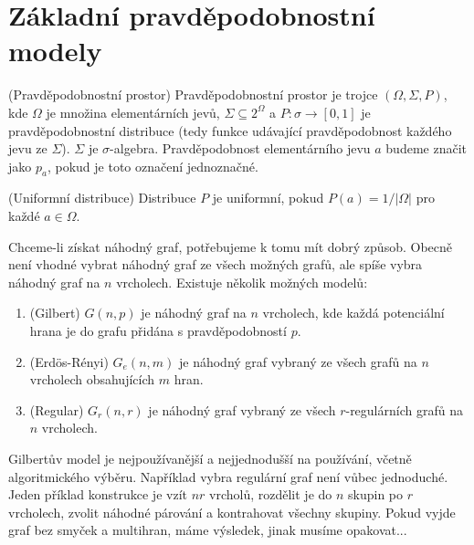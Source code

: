 \section{Základní pravděpodobnostní modely}
\df (Pravděpodobnostní prostor) Pravděpodobnostní prostor je trojce $(\Omega, 
\Sigma, P)$, kde $\Omega$ je množina elementárních jevů, $\Sigma \subseteq 
2^\Omega$ a $P: \sigma \to [ 0, 1 ]$ je pravděpodobnostní distribuce (tedy 
funkce udávající pravděpodobnost každého jevu ze $\Sigma$).  $\Sigma$ je 
$\sigma$-algebra. Pravděpodobnost elementárního jevu $a$ budeme značit jako 
$p_a$, pokud je toto označení jednoznačné.


\df (Uniformní distribuce) Distribuce $P$ je uniformní, pokud $P(a) = 1 / 
|\Omega|$ pro každé $a \in \Omega$.

Chceme-li získat náhodný graf, potřebujeme k tomu mít dobrý způsob. Obecně není 
vhodné vybrat náhodný graf ze všech možných grafů, ale spíše vybra náhodný graf 
na $n$ vrcholech. Existuje několik možných modelů:
\begin{enumerate}
	\item (Gilbert) $G(n,p)$ je náhodný graf na $n$ vrcholech, kde každá 
		potenciální hrana je do grafu přidána s pravděpodobností $p$.
	\item (Erdös-Rényi) $G_e(n,m)$ je náhodný graf vybraný ze všech grafů na $n$ 
		vrcholech obsahujících $m$ hran.
	\item (Regular) $G_r(n,r)$ je náhodný graf vybraný ze všech $r$-regulárních 
		grafů na $n$ vrcholech.
\end{enumerate}
Gilbertův model je nejpoužívanější a nejjednodušší na používání, včetně 
algoritmického výběru. Například vybra regulární graf není vůbec jednoduché.  
Jeden příklad konstrukce je vzít $nr$ vrcholů, rozdělit je do $n$ skupin po $r$ 
vrcholech, zvolit náhodné párování a kontrahovat všechny skupiny. Pokud vyjde 
graf bez smyček a multihran, máme výsledek, jinak musíme opakovat...


